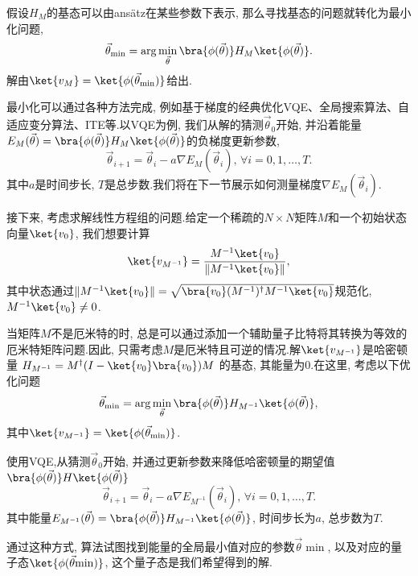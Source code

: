 \par 假设$H_{M}$的基态可以由ansätz在某些参数下表示, 那么寻找基态的问题就转化为最小化问题, 
\begin{align}
	\vec{\theta}_{\min}=\arg \min_{\vec{\theta}}\bra{\phi(\vec{\theta})} H_{M} \ket{\phi(\vec{\theta})}.
\end{align}
解由$\ket{v_M} = \ket{\phi(\vec{\theta}_{\min})}$给出. \par 最小化可以通过各种方法完成, 例如基于梯度的经典优化VQE、全局搜索算法、自适应变分算法、ITE等.以VQE为例, 我们从解的猜测$\vec{\theta}_0$开始, 并沿着能量$E_M(\vec\theta) = \bra{\phi(\vec{\theta})}H_{M}\ket{\phi(\vec{\theta})}$的负梯度更新参数, 
\begin{equation}
	\vec{\theta}_{i+1} = \vec{\theta}_{i} - a \nabla E_M(\vec\theta_i), \,\forall i  = 0, 1, \dots, T.
\end{equation}
其中$a$是时间步长, $T$是总步数.我们将在下一节展示如何测量梯度$\nabla E_{M}(\vec\theta_i)$.

接下来, 考虑求解线性方程组的问题.给定一个稀疏的$N \times N$矩阵$M$和一个初始状态向量$\ket{v_0}$, 我们想要计算
\begin{align} 
	\ket{v_{M^{-1}}} = \frac{M^{-1} \ket{v_0}}{\|M^{-1} \ket{v_0} \|},
\end{align}
其中状态通过$\|M^{-1} \ket{v_0} \| = \sqrt{\bra{v_0}({M}^{-1})^{\dagger} {M}^{-1} \ket{v_0}}$规范化, $M^{-1} \ket{v_0}\ne 0$.
\par 当矩阵$M$不是厄米特的时, 总是可以通过添加一个辅助量子比特将其转换为等效的厄米特矩阵问题.因此, 只需考虑$M$是厄米特且可逆的情况.解$\ket{v_{M^{-1}}}$是哈密顿量
$H_{M^{-1}}=M^\dag (I-\ket{v_0}\bra{v_0})M$
的基态, 其能量为$0$.在这里, 考虑以下优化问题
\begin{align}
	\vec{\theta}_{\min}=\arg \min_{\vec{\theta}}\bra{\phi(\vec{\theta})} H_{M^{-1}} \ket{\phi(\vec{\theta})},
\end{align}
其中$\ket{v_{M^{-1}}} = \ket{\phi(\vec{\theta}_{\min})}$.\par 使用VQE,从猜测$\vec{\theta}_0$开始, 并通过更新参数来降低哈密顿量的期望值$\bra{\phi(\vec{\theta})}H\ket{\phi(\vec{\theta})}$
\begin{equation}
	\vec{\theta}_{i+1} = \vec{\theta}_{i} - a \nabla E_{M^{-1}}(\vec\theta_i), \,\forall i  = 0, 1, \dots, T.
\end{equation}
其中能量$E_{M^{-1}}(\vec\theta) = \bra{\phi(\vec{\theta})}H_{M^{-1}}\ket{\phi(\vec{\theta})}$, 时间步长为$a$, 总步数为$T$.

通过这种方式, 算法试图找到能量的全局最小值对应的参数$\vec{\theta}{\min}$, 以及对应的量子态$\ket{\phi(\vec{\theta}{\min})}$, 这个量子态是我们希望得到的解.

